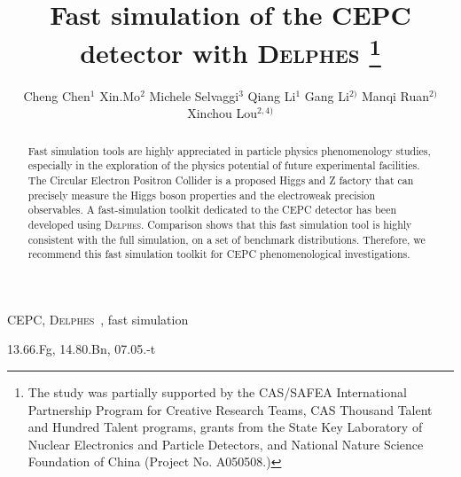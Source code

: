 \documentclass[a4paper,10pt,twoside]{cpc-hepnp}
\begin{document}



\title{Fast simulation of the CEPC detector with {\textsc{Delphes}}
\thanks{The study was partially supported by the CAS/SAFEA International Partnership Program for Creative Research Teams, CAS Thousand Talent and Hundred Talent programs, grants from the State Key Laboratory of Nuclear Electronics and Particle Detectors, and National Nature Science Foundation of China (Project No. A050508.)}}

\author{%
Cheng Chen$^{1}$
\quad Xin.Mo$^{2}$
\quad Michele Selvaggi$^{3}$
\quad Qiang Li$^{1}$
\quad Gang Li$^{2)}$%
\quad Manqi Ruan$^{2)}$%
\quad Xinchou Lou$^{2,4)}$%
}
\maketitle


\address{%
$^1$ Institute of High Energy Physics (IHEP), Chinese Academy of Sciences, Beijing 100049, China\\
$^3$ European Organization for Nuclear Research (CERN), Switzerland \\
$^2$ Peking University, Beijing, China\\ 
$^3$ University of Texas at Dallas, Richardson, TX 75080-3021, USA
}


\begin{abstract}
Fast simulation tools are highly appreciated in particle physics phenomenology studies, especially in the exploration of the  physics potential of future experimental facilities. 
The Circular Electron Positron Collider is a proposed Higgs and Z factory that can precisely measure the Higgs boson properties and the electroweak precision observables. 
A fast-simulation toolkit dedicated to the CEPC detector has been developed using {\textsc{Delphes}}.
Comparison shows that this fast simulation tool is highly consistent with the full simulation, on a set of benchmark distributions.  
Therefore, we recommend this fast simulation toolkit for CEPC phenomenological investigations. 
\end{abstract}


\begin{keyword}
CEPC, {\textsc{Delphes}~}, fast simulation
\end{keyword}

\begin{pacs}
13.66.Fg, 14.80.Bn, 07.05.-t
\end{pacs}
\end{document}
